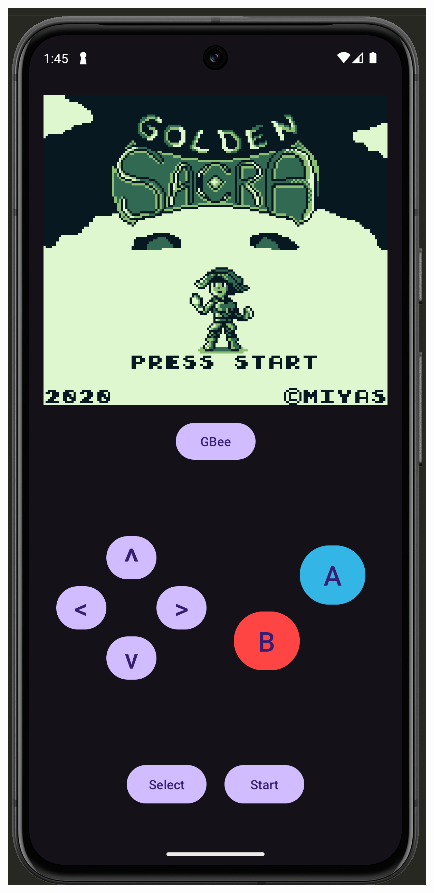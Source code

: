 \begin{figure}[H]
    \centering
    \begin{minipage}{0.30\textwidth}
        \centering
        \includegraphics[width=\textwidth]{include/images/design_1_1.png}

\end{minipage}
\end{figure}
